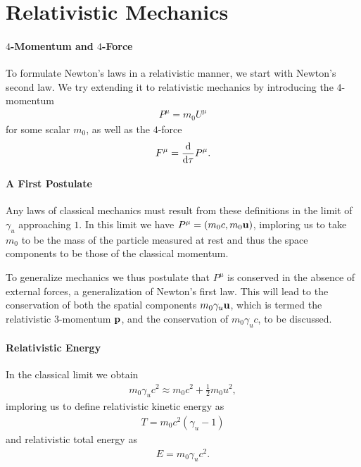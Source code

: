 \section{Relativistic Mechanics}

\paragraph{$4$-Momentum and $4$-Force}
To formulate Newton's laws in a relativistic manner, we start with Newton's second law. We try extending it to relativistic mechanics by introducing the $4$-momentum
\begin{align*}
	P^{\mu} = m_{0}U^{\mu}
\end{align*}
for some scalar $m_{0}$, as well as the $4$-force
\begin{align*}
	F^{\mu} = \dv{\tau}P^{\mu}.
\end{align*}

\paragraph{A First Postulate}
Any laws of classical mechanics must result from these definitions in the limit of $\gamma_{u}$ approaching $1$. In this limit we have $P^{\mu} = (m_{0}c, m_{0}\vb{u})$, imploring us to take $m_{0}$ to be the mass of the particle measured at rest and thus the space components to be those of the classical momentum.

To generalize mechanics we thus postulate that $P^{\mu}$ is conserved in the absence of external forces, a generalization of Newton's first law. This will lead to the conservation of both the spatial components $m_{0}\gamma_{u}\vb{u}$, which is termed the relativistic $3$-momentum $\vb{p}$, and the conservation of $m_{0}\gamma_{u}c$, to be discussed.

\paragraph{Relativistic Energy}
In the classical limit we obtain
\begin{align*}
	m_{0}\gamma_{u}c^{2} \approx m_{0}c^{2} + \frac{1}{2}m_{0}u^{2},
\end{align*}
imploring us to define relativistic kinetic energy as
\begin{align*}
	T = m_{0}c^{2}(\gamma_{u} - 1)
\end{align*}
and relativistic total energy as
\begin{align*}
	E = m_{0}\gamma_{u}c^{2}.
\end{align*}

